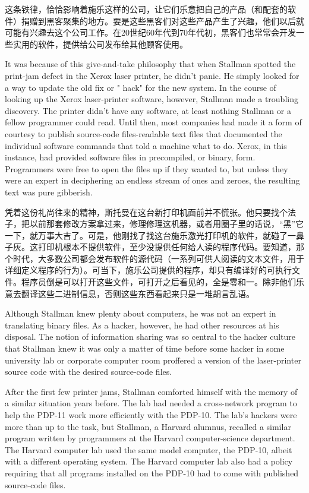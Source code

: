 \ifdefined\chs
这条铁律，恰恰影响着施乐这样的公司，让它们乐意把自己的产品（和配套的软件）捐赠到黑客聚集的地方。要是这些黑客们对这些产品产生了兴趣，他们以后就可能有兴趣去这个公司工作。在20世纪60年代到70年代初，黑客们也常常会开发一些实用的软件，提供给公司发布给其他顾客使用。
\fi

\ifdefined\eng
It was because of this give-and-take philosophy that when Stallman spotted the print-jam defect in the Xerox laser printer, he didn't panic. He simply looked for a way to update the old fix or " hack" for the new system. In the course of looking up the Xerox laser-printer software, however, Stallman made a troubling discovery. The printer didn't have any software, at least nothing Stallman or a fellow programmer could read. Until then, most companies had made it a form of courtesy to publish source-code files-readable text files that documented the individual software commands that told a machine what to do. Xerox, in this instance, had provided software files in precompiled, or binary, form. Programmers were free to open the files up if they wanted to, but unless they were an expert in deciphering an endless stream of ones and zeroes, the resulting text was pure gibberish.
\fi

\ifdefined\chs
凭着这份礼尚往来的精神，斯托曼在这台新打印机面前并不慌张。他只要找个法子，把以前那套修改方案拿过来，修理修理这机器，或者用圈子里的话说，``黑''它一下，就万事大吉了。可是，他刚找了找这台施乐激光打印机的软件，就碰了一鼻子灰。这打印机根本不提供软件，至少没提供任何给人读的程序代码。要知道，那个时代，大多数公司都会发布软件的源代码（一系列可供人阅读的文本文件，用于详细定义程序的行为）。可当下，施乐公司提供的程序，却只有编译好的可执行文件。程序员倒是可以打开这些文件，可打开之后看见的，全是零和一。除非他们乐意去翻译这些二进制信息，否则这些东西看起来只是一堆胡言乱语。
\fi

\ifdefined\eng
Although Stallman knew plenty about computers, he was not an expert in translating binary files. As a hacker, however, he had other resources at his disposal. The notion of information sharing was so central to the hacker culture that Stallman knew it was only a matter of time before some hacker in some university lab or corporate computer room proffered a version of the laser-printer source code with the desired source-code files.
\fi

\ifdefined\eng
After the first few printer jams, Stallman comforted himself with the memory of a similar situation years before. The lab had needed a cross-network program to help the PDP-11 work more efficiently with the PDP-10. The lab's hackers were more than up to the task, but Stallman, a Harvard alumnus, recalled a similar program written by programmers at the Harvard computer-science department. The Harvard computer lab used the same model computer, the PDP-10, albeit with a different operating system. The Harvard computer lab also had a policy requiring that all programs installed on the PDP-10 had to come with published source-code files.
\fi

